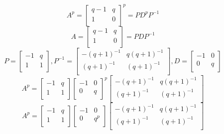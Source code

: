 \documentclass[paper.tex]{subfiles}
\begin{document}
\[ A^{p} =
\left[ \begin{array}{ccc}
q-1 & q \\
1 & 0 \\
\end{array} \right] ^{p}
=
PD^{p}P^{-1}
\]
\[ A =
\left[ \begin{array}{ccc}
q-1 & q \\
1 & 0 \\
\end{array} \right]
=
PDP^{-1}
\]
\[ P =
\left[ \begin{array}{ccc}
-1 & q \\
1 & 1 \\
\end{array} \right]
, P^{-1} =
\left[ \begin{array}{ccc}
-(q+1)^{-1} & q(q+1)^{-1} \\
(q+1)^{-1} & (q+1)^{-1} \\
\end{array} \right]
, D =
\left[ \begin{array}{ccc}
-1 & 0 \\
0 & q \\
\end{array} \right]
\]
\[ A^{p}
=
\left[ \begin{array}{ccc}
-1 & q \\
1 & 1 \\
\end{array} \right]
\left[ \begin{array}{ccc}
-1 & 0 \\
0 & q \\
\end{array} \right] ^{p}
\left[ \begin{array}{ccc}
-(q+1)^{-1} & q(q+1)^{-1} \\
(q+1)^{-1} & (q+1)^{-1} \\
\end{array} \right]
\]
\[ A^{p}
=
\left[ \begin{array}{ccc}
-1 & q \\
1 & 1 \\
\end{array} \right]
\left[ \begin{array}{ccc}
-1 & 0 \\
0 & q^{p} \\
\end{array} \right]
\left[ \begin{array}{ccc}
-(q+1)^{-1} & q(q+1)^{-1} \\
(q+1)^{-1} & (q+1)^{-1} \\
\end{array} \right]
\]
\end{document}
